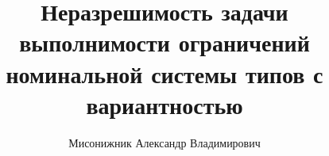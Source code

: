
\title{Неразрешимость задачи выполнимости ограничений номинальной системы типов с вариантностью}

\author{Мисонижник Александр Владимирович}





\theoremstyle{plain}

\theoremstyle{definition}
\newtheorem*{proof*}{Доказательство}

\newcommand{\defnautorefname}{Определение}
\newcommand{\lemautorefname}{Лемма}
\newcommand{\remkautorefname}{Замечание}
\newcommand{\propautorefname}{Высказывание}
\newcommand{\exmpautorefname}{Пример}
\newcommand{\thmautorefname}{Теорема}
\newcommand{\crlrautorefname}{Следствие}
\renewcommand{\sectionautorefname}{Раздел}
\newcommand{\Listingautorefname}{Листнг}
\newcommand{\Figureautorefname}{Рисунок}

\maketitle













